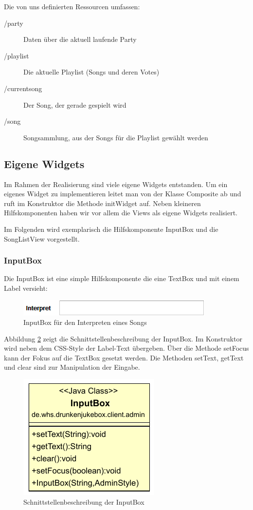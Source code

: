 Die von uns definierten Ressourcen umfassen:
\begin{description}
	\item[/party] Daten über die aktuell laufende Party
	\item[/playlist] Die aktuelle Playlist (Songs und deren Votes)
	\item[/currentsong] Der Song, der gerade gespielt wird
	\item[/song] Songsammlung, aus der Songs für die Playlist gewählt werden
\end{description}

\subsection{Eigene Widgets}
Im Rahmen der Realisierung sind viele eigene Widgets entstanden. Um ein eigenes Widget zu implementieren leitet man von der Klasse Composite ab und ruft im Konstruktor die Methode initWidget auf. Neben kleineren Hilfskomponenten haben wir vor allem die Views als eigene Widgets realisiert.

Im Folgenden wird exemplarisch die Hilfskomponente InputBox und die SongListView vorgestellt.

\subsubsection{InputBox}
Die InputBox ist eine simple Hilfskomponente die eine TextBox und mit einem Label versieht:

\begin{figure}[H]
\centering
\includegraphics[width=0.7\linewidth]{Bilder/InputBox}
\caption{InputBox für den Interpreten eines Songs}
\label{fig:InputBox}
\end{figure}

Abbildung \ref{fig:InputBoxClass} zeigt die Schnittstellenbeschreibung der InputBox. Im Konstruktor wird neben dem CSS-Style der Label-Text übergeben. Über die Methode setFocus kann der Fokus auf die TextBox gesetzt werden. Die Methoden setText, getText und clear sind zur Manipulation der Eingabe.

\begin{figure}[H]
\centering
\includegraphics[width=0.3\linewidth]{Bilder/InputBoxClass}
\caption{Schnittstellenbeschreibung der InputBox}
\label{fig:InputBoxClass}
\end{figure}


